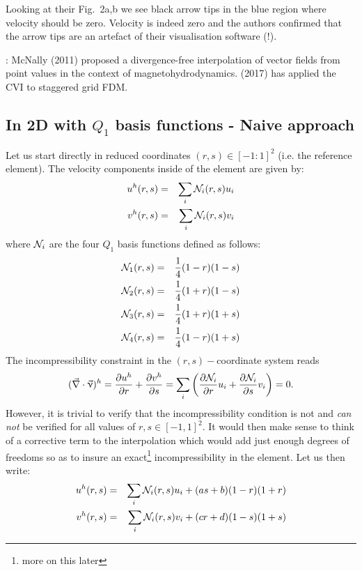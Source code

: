 Looking at their Fig.~2a,b we see black arrow tips in the blue region where 
velocity should be zero. Velocity is indeed zero and the authors confirmed that 
the arrow tips are an artefact of their visualisation software (!).

\Literature: 
McNally (2011) \cite{mcna11} proposed
a divergence-free interpolation of vector fields from point values in the context 
of magnetohydrodynamics. \textcite{pukp17} (2017) has applied the CVI to staggered grid FDM.

 
\subsection{In 2D with $Q_1$ basis functions - Naive approach}

Let us start directly in reduced coordinates $(r,s)\in [-1:1]^2$ (i.e. the reference element).
The velocity components inside of the element are given by:
\begin{eqnarray}
u^h(r,s)&=&\sum_i {\mathcal{N}}_i(r,s) u_i \nonumber\\
v^h(r,s)&=&\sum_i {\mathcal{N}}_i(r,s) v_i \nonumber
\end{eqnarray}
where ${\mathcal{N}}_i$ are the four $Q_1$ basis functions defined as follows:
\begin{eqnarray}
{\mathcal{N}}_1(r,s)&=& \frac{1}{4}(1-r)(1-s)  \nonumber\\ 
{\mathcal{N}}_2(r,s)&=& \frac{1}{4}(1+r)(1-s)  \nonumber\\ 
{\mathcal{N}}_3(r,s)&=& \frac{1}{4}(1+r)(1+s)  \nonumber\\ 
{\mathcal{N}}_4(r,s)&=& \frac{1}{4}(1-r)(1+s)  \nonumber
\end{eqnarray}
The incompressibility constraint in the $(r,s)-$coordinate system reads
\[
(\vec\nabla\cdot\vec\upnu)^h=
\frac{\partial u^h}{\partial r}+
\frac{\partial v^h}{\partial s}
=
\sum_i \left(  
\frac{\partial {\mathcal{N}}_i}{\partial r} u_i+
\frac{\partial {\mathcal{N}}_i}{\partial s} v_i
\right)
=0.
\]
However, it is trivial to verify that the incompressibility 
condition is not and \textit{can not} be verified for all values of  
$r,s \in [-1,1]^2$.
It would then make sense to think of a corrective term to the interpolation
which would add just enough degrees of freedoms so as to insure an exact\footnote{more
on this later} incompressibility in the element. 
Let us then write:
\begin{eqnarray}
u^h(r,s)&=&\sum_i {\mathcal{N}}_i(r,s) u_i + (a s + b)(1-r)(1+r) \nonumber\\
v^h(r,s)&=&\sum_i {\mathcal{N}}_i(r,s) v_i + (c r + d)(1-s)(1+s) \nonumber
\end{eqnarray}

